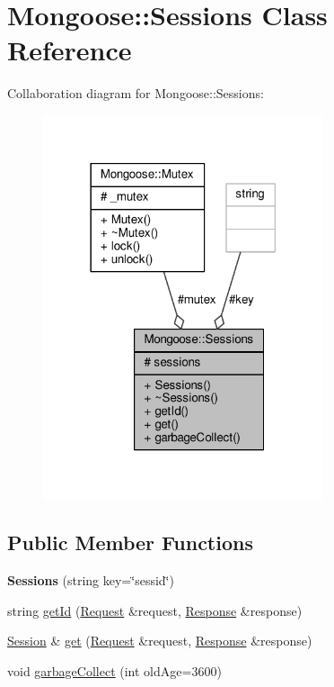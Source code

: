 \hypertarget{classMongoose_1_1Sessions}{}\section{Mongoose\+:\+:Sessions Class Reference}
\label{classMongoose_1_1Sessions}


Collaboration diagram for Mongoose\+:\+:Sessions\+:
\nopagebreak
\begin{figure}[H]
\begin{center}
\leavevmode
\includegraphics[width=234pt]{db/da1/classMongoose_1_1Sessions__coll__graph}
\end{center}
\end{figure}
\subsection*{Public Member Functions}
\begin{DoxyCompactItemize}
\item 
{\bfseries Sessions} (string key=\char`\"{}sessid\char`\"{})\hypertarget{classMongoose_1_1Sessions_a30d8ed311ce6092071b25fea717b448e}{}\label{classMongoose_1_1Sessions_a30d8ed311ce6092071b25fea717b448e}

\item 
string \hyperlink{classMongoose_1_1Sessions_a8323fe10b456891337c05ff4358bede8}{get\+Id} (\hyperlink{classMongoose_1_1Request}{Request} \&request, \hyperlink{classMongoose_1_1Response}{Response} \&response)
\item 
\hyperlink{classMongoose_1_1Session}{Session} \& \hyperlink{classMongoose_1_1Sessions_a160e49534d6e426eaa72fc77313fb150}{get} (\hyperlink{classMongoose_1_1Request}{Request} \&request, \hyperlink{classMongoose_1_1Response}{Response} \&response)
\item 
void \hyperlink{classMongoose_1_1Sessions_aaa120a3d5b2567629f3c233bba4a4e93}{garbage\+Collect} (int old\+Age=3600)
\end{DoxyCompactItemize}
